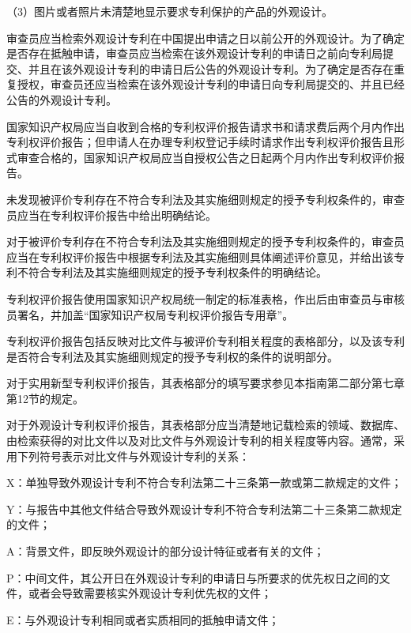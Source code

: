{\setlength{\parindent}{17.1bp}（3）图片或者照片未清楚地显示要求专利保护的产品的外观设计。\par}

审查员应当检索外观设计专利在中国提出申请之日以前公开的外观设计。为了确定是否存在抵触申请，审查员应当检索在该外观设计专利的申请日之前向专利局提交、并且在该外观设计专利的申请日后公告的外观设计专利。为了确定是否存在重复授权，审查员还应当检索在该外观设计专利的申请日向专利局提交的、并且已经公告的外观设计专利。

国家知识产权局应当自收到合格的专利权评价报告请求书和请求费后两个月内作出专利权评价报告；但申请人在办理专利权登记手续时请求作出专利权评价报告且形式审查合格的，国家知识产权局应当自授权公告之日起两个月内作出专利权评价报告。

未发现被评价专利存在不符合专利法及其实施细则规定的授予专利权条件的，审查员应当在专利权评价报告中给出明确结论。

对于被评价专利存在不符合专利法及其实施细则规定的授予专利权条件的，审查员应当在专利权评价报告中根据专利法及其实施细则具体阐述评价意见，并给出该专利不符合专利法及其实施细则规定的授予专利权条件的明确结论。

专利权评价报告使用国家知识产权局统一制定的标准表格，作出后由审查员与审核员署名，并加盖“国家知识产权局专利权评价报告专用章”。

专利权评价报告包括反映对比文件与被评价专利相关程度的表格部分，以及该专利是否符合专利法及其实施细则规定的授予专利权的条件的说明部分。

对于实用新型专利权评价报告，其表格部分的填写要求参见本指南第二部分第七章第12节的规定。

对于外观设计专利权评价报告，其表格部分应当清楚地记载检索的领域、数据库、由检索获得的对比文件以及对比文件与外观设计专利的相关程度等内容。通常，采用下列符号表示对比文件与外观设计专利的关系：

X：单独导致外观设计专利不符合专利法第二十三条第一款或第二款规定的文件；

Y：与报告中其他文件结合导致外观设计专利不符合专利法第二十三条第二款规定的文件；

A：背景文件，即反映外观设计的部分设计特征或者有关的文件；

P：中间文件，其公开日在外观设计专利的申请日与所要求的优先权日之间的文件，或者会导致需要核实外观设计专利优先权的文件；

E：与外观设计专利相同或者实质相同的抵触申请文件；

